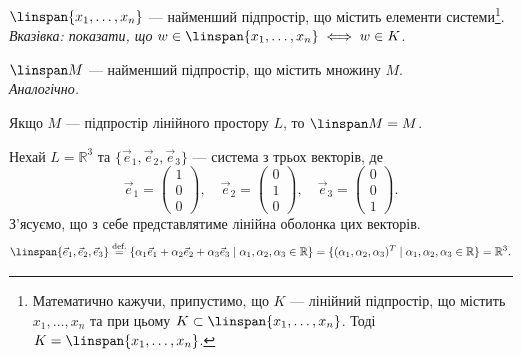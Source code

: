\documentclass{math_library}
\begin{document}
	\begin{proposition}
	$\linspan \{x_1,\dots,x_n \}$ --- найменший підпростір, що містить елементи системи\footnote{Математично кажучи, припустимо, що $K$ --- лінійний підпростір, що містить $x_1,\dots,x_n$ та при цьому $K \subset \linspan \{x_1,\dots,x_n \}$. Тоді $K = \linspan \{x_1,\dots,x_n \}$.}.\\
	\textit{Вказівка: показати, що} $w \in \linspan\{x_1,\dots,x_n \} \iff w \in K$.
	\end{proposition}
	
	\begin{proposition}
	$\linspan M$ --- найменший підпростір, що містить множину $M$.\\
	\textit{Аналогічно.}
	\end{proposition}
	
	\begin{corollary}
	Якщо $M$ --- підпростір лінійного простору $L$, то $\linspan M = M$.
	\end{corollary}
	
	\begin{example}
	\label{find_span_of_elements}
	Нехай $L = \mathbb{R}^3$ та $\{\vec{e}_1,\vec{e}_2,\vec{e}_3\}$ --- система з трьох векторів, де
	\[
	\vec{e}_1 =\begin{pmatrix} 1\\ 0\\ 0 \end{pmatrix}, \quad \vec{e}_2 =\begin{pmatrix} 0\\ 1\\ 0 \end{pmatrix}, \quad \vec{e}_3 =\begin{pmatrix} 0\\ 0\\ 1 \end{pmatrix}.
	\]
	З'ясуємо, що з себе представлятиме лінійна оболонка цих векторів.
	\[
	\linspan\{\vec{e}_1, \vec{e}_2, \vec{e}_3\} \overset{\text{def.}}{=} \{\alpha_1 \vec{e}_1 + \alpha_2 \vec{e}_2 + \alpha_3 \vec{e}_3 \mid \alpha_1, \alpha_2, \alpha_3 \in \mathbb{R}\} = \{(\alpha_1, \alpha_2, \alpha_3)^T \mid \alpha_1, \alpha_2, \alpha_3 \in \mathbb{R}\} = \mathbb{R}^3.
	\]
	\end{example}
	

		
\end{document}
